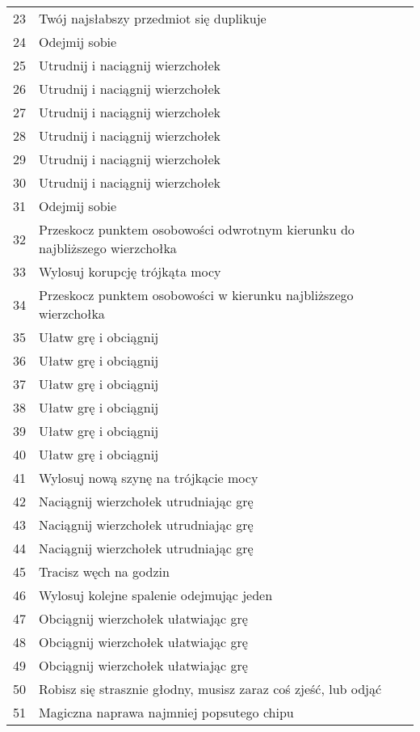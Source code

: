\begin{longtabu}{ l l }
23			&	Twój najsłabszy przedmiot się duplikuje \\
24			&	Odejmij sobie \diiii{} \abkar{} \\
25			&	Utrudnij i naciągnij wierzchołek \abi{} \\
26			&	Utrudnij i naciągnij wierzchołek \abh{} \\
27			&	Utrudnij i naciągnij wierzchołek \aba{} \\
28			&	Utrudnij i naciągnij wierzchołek \abt{} \\
29			&	Utrudnij i naciągnij wierzchołek \abp{} \\
30			&	Utrudnij i naciągnij wierzchołek \abs{} \\
31			&	Odejmij sobie \diiii{} \abzyc{} \\
32			&	Przeskocz punktem osobowości odwrotnym kierunku do najbliższego wierzchołka \\
33			&	Wylosuj korupcję trójkąta mocy 	\\
34			&	Przeskocz punktem osobowości w kierunku najbliższego wierzchołka \\
35			&	Ułatw grę i obciągnij \abp{} \\
36			&	Ułatw grę i obciągnij \abt{} \\
37			&	Ułatw grę i obciągnij \abh{} \\
38			&	Ułatw grę i obciągnij \abi{} \\
39			&	Ułatw grę i obciągnij \abs{} \\
40			&	Ułatw grę i obciągnij \aba{} \\
41			&	Wylosuj nową szynę na trójkącie mocy \\
42			&	Naciągnij wierzchołek \absm{} utrudniając grę \\
43			&	Naciągnij wierzchołek \abdm{} utrudniając grę \\
44			&	Naciągnij wierzchołek \abrm{} utrudniając grę \\
45			&	Tracisz węch na \dc{} godzin \\
46			&	Wylosuj kolejne spalenie odejmując jeden \abkar{} \\
47			&	Obciągnij wierzchołek \abdm{} ułatwiając grę \\
48			&	Obciągnij wierzchołek \absm{}	ułatwiając grę \\
49			&	Obciągnij wierzchołek \absm{}	ułatwiając grę \\
50			&	Robisz się strasznie głodny, musisz zaraz coś zjeść, lub odjąć \abzyc{} \\
51			&	Magiczna naprawa najmniej popsutego chipu \\

\end{longtabu}
